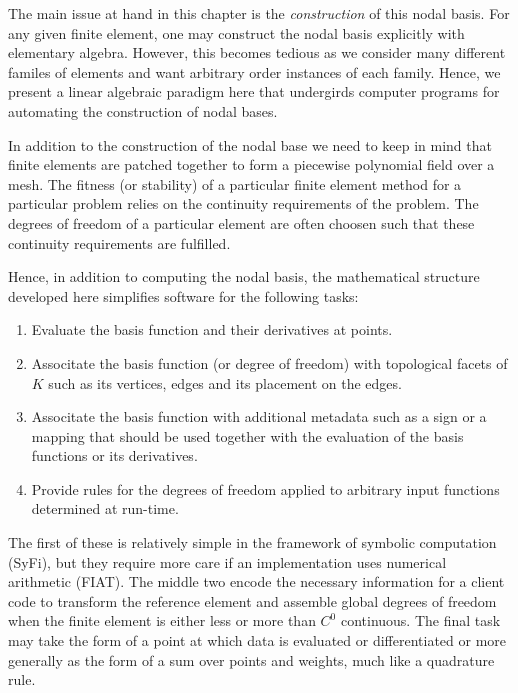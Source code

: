 The main issue at hand in this chapter is the \emph{construction} of 
this nodal basis.  For
any given finite element, one may construct the nodal basis
explicitly with elementary algebra.  However, this becomes tedious as
we consider many different familes of elements and want arbitrary
order instances of each family.  Hence, we present a linear algebraic
paradigm here that undergirds computer programs for automating the
construction of nodal bases. 

In addition to the construction of the nodal base we need to keep in mind that 
finite elements are patched together to form a piecewise 
polynomial field over a mesh. The fitness (or stability) of a particular finite element method for a particular problem relies on the continuity
requirements of the problem. The degrees of freedom of a particular element
are often choosen such that these continuity requirements are fulfilled.

Hence, in addition to computing the nodal basis, the mathematical structure developed here 
simplifies software for the following tasks:

\begin{enumerate}
\item Evaluate the basis function and their derivatives at points.  
\item Associtate the basis function (or degree of freedom) with
      topological facets of \( K \) such as its vertices, edges and its 
      placement on the edges.   
\item Associtate the basis function with additional metadata such
      as a sign or a mapping that should be used together with 
      the evaluation of the basis functions or its derivatives.
\item Provide rules for the degrees of freedom applied to arbitrary input
      functions determined at run-time.
\end{enumerate}


The first of these is relatively simple in the framework
of symbolic computation (SyFi), but they require more care if an
implementation uses numerical arithmetic (FIAT).  The middle two
encode the necessary information for a client code to transform the
reference element and assemble global degrees of freedom when the
finite element is either less or more than $C^0$ continuous. The final
task may take the form of a point at which data is evaluated or
differentiated or more generally as the form of a sum over points and
weights,  much like a quadrature rule.


